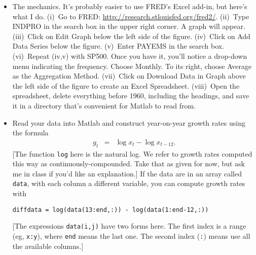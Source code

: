 \documentclass[11pt]{exam}
\begin{document}
\begin{questions}
\begin{itemize}
\item The mechanics.
It's probably easier to use FRED's Excel add-in,
but here's what I do.
(i)~Go to FRED:  \url{http://research.stlouisfed.org/fred2/}.
(ii)~Type INDPRO in the search box in the upper right corner.
A graph will appear.
(iii)~Click on Edit Graph below the left side of the figure.
(iv)~Click on Add Data Series below the figure.
(v)~Enter PAYEMS in the search box.
(vi)~Repeat (iv,v) with SP500.  Once you have it, you'll notice
a drop-down menu indicating the frequency.  Choose Monthly.
To its right, choose Average as the Aggregation Method.
(vii)~Click on Download Data in Graph above the left side of the figure
to create an Excel Spreadsheet.
(viii)~Open the spreadsheet, delete everything before 1960, including the headings,
and save it in a directory that's convenient for Matlab to read from.

\item Read your data into Matlab and construct year-on-year growth rates
using the formula
\begin{eqnarray*}
    g_{t} &=& \log x_t - \log x_{t-12} .
\end{eqnarray*}
[The function {\tt log} here is the natural log.
We refer to growth rates computed this way as continuously-compounded.
Take that as given for now,
but ask me in class if you'd like an explanation.]
If the data are in an array called {\tt data}, with each column a different variable,
you can compute growth rates with
\begin{verbatim}
diffdata = log(data(13:end,:)) - log(data(1:end-12,:))
\end{verbatim}
[The expressions {\tt data(i,j)} have two forms here.
The first index is a range (eg, {\tt x:y}), where
{\tt end} means the last one.
The second index ({\tt :}) means use all the available columns.]
\end{itemize}
%
%


\end{questions}
\end{document}
